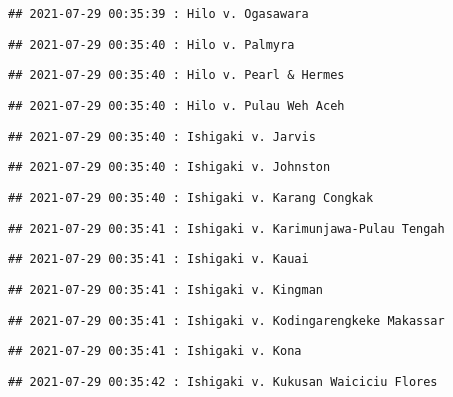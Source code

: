 \documentclass[
]{article}
\begin{document}
\begin{verbatim}
## 2021-07-29 00:35:39 : Hilo v. Ogasawara
\end{verbatim}

\begin{verbatim}
## 2021-07-29 00:35:40 : Hilo v. Palmyra
\end{verbatim}

\begin{verbatim}
## 2021-07-29 00:35:40 : Hilo v. Pearl & Hermes
\end{verbatim}

\begin{verbatim}
## 2021-07-29 00:35:40 : Hilo v. Pulau Weh Aceh
\end{verbatim}

\begin{verbatim}
## 2021-07-29 00:35:40 : Ishigaki v. Jarvis
\end{verbatim}

\begin{verbatim}
## 2021-07-29 00:35:40 : Ishigaki v. Johnston
\end{verbatim}

\begin{verbatim}
## 2021-07-29 00:35:40 : Ishigaki v. Karang Congkak
\end{verbatim}

\begin{verbatim}
## 2021-07-29 00:35:41 : Ishigaki v. Karimunjawa-Pulau Tengah
\end{verbatim}

\begin{verbatim}
## 2021-07-29 00:35:41 : Ishigaki v. Kauai
\end{verbatim}

\begin{verbatim}
## 2021-07-29 00:35:41 : Ishigaki v. Kingman
\end{verbatim}

\begin{verbatim}
## 2021-07-29 00:35:41 : Ishigaki v. Kodingarengkeke Makassar
\end{verbatim}

\begin{verbatim}
## 2021-07-29 00:35:41 : Ishigaki v. Kona
\end{verbatim}

\begin{verbatim}
## 2021-07-29 00:35:42 : Ishigaki v. Kukusan Waiciciu Flores
\end{verbatim}
\end{document}
